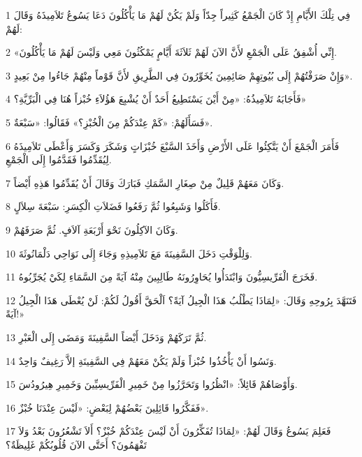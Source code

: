 \par 1 فِي تِلْكَ الأَيَّامِ إِذْ كَانَ الْجَمْعُ كَثِيراً جِدّاً وَلَمْ يَكُنْ لَهُمْ مَا يَأْكُلُونَ دَعَا يَسُوعُ تَلاَمِيذَهُ وَقَالَ لَهُمْ:
\par 2 «إِنِّي أُشْفِقُ عَلَى الْجَمْعِ لأَنَّ الآنَ لَهُمْ ثَلاَثَةَ أَيَّامٍ يَمْكُثُونَ مَعِي وَلَيْسَ لَهُمْ مَا يَأْكُلُونَ.
\par 3 وَإِنْ صَرَفْتُهُمْ إِلَى بُيُوتِهِمْ صَائِمِينَ يُخَوِّرُونَ فِي الطَّرِيقِ لأَنَّ قَوْماً مِنْهُمْ جَاءُوا مِنْ بَعِيدٍ».
\par 4 فَأَجَابَهُ تَلاَمِيذُهُ: «مِنْ أَيْنَ يَسْتَطِيعُ أَحَدٌ أَنْ يُشْبِعَ هَؤُلاَءِ خُبْزاً هُنَا فِي الْبَرِّيَّةِ؟»
\par 5 فَسَأَلَهُمْ: «كَمْ عِنْدَكُمْ مِنَ الْخُبْزِ؟» فَقَالُوا: «سَبْعَةٌ».
\par 6 فَأَمَرَ الْجَمْعَ أَنْ يَتَّكِئُوا عَلَى الأَرْضِ وَأَخَذَ السَّبْعَ خُبْزَاتٍ وَشَكَرَ وَكَسَرَ وَأَعْطَى تَلاَمِيذَهُ لِيُقَدِّمُوا فَقَدَّمُوا إِلَى الْجَمْعِ.
\par 7 وَكَانَ مَعَهُمْ قَلِيلٌ مِنْ صِغَارِ السَّمَكِ فَبَارَكَ وَقَالَ أَنْ يُقَدِّمُوا هَذِهِ أَيْضاً.
\par 8 فَأَكَلُوا وَشَبِعُوا ثُمَّ رَفَعُوا فَضَلاَتِ الْكِسَرِ: سَبْعَةَ سِلاَلٍ.
\par 9 وَكَانَ الآكِلُونَ نَحْوَ أَرْبَعَةِ آلاَفٍ. ثُمَّ صَرَفَهُمْ.
\par 10 وَلِلْوَقْتِ دَخَلَ السَّفِينَةَ مَعَ تَلاَمِيذِهِ وَجَاءَ إِلَى نَوَاحِي دَلْمَانُوثَةَ.
\par 11 فَخَرَجَ الْفَرِّيسِيُّونَ وَابْتَدَأُوا يُحَاوِرُونَهُ طَالِبِينَ مِنْهُ آيَةً مِنَ السَّمَاءِ لِكَيْ يُجَرِّبُوهُ.
\par 12 فَتَنَهَّدَ بِرُوحِهِ وَقَالَ: «لِمَاذَا يَطْلُبُ هَذَا الْجِيلُ آيَةً؟ اَلْحَقَّ أَقُولُ لَكُمْ: لَنْ يُعْطَى هَذَا الْجِيلُ آيَةً!»
\par 13 ثُمَّ تَرَكَهُمْ وَدَخَلَ أَيْضاً السَّفِينَةَ وَمَضَى إِلَى الْعَبْرِ.
\par 14 وَنَسُوا أَنْ يَأْخُذُوا خُبْزاً وَلَمْ يَكُنْ مَعَهُمْ فِي السَّفِينَةِ إلاَّ رَغِيفٌ وَاحِدٌ.
\par 15 وَأَوْصَاهُمْ قَائِلاً: «انْظُرُوا وَتَحَرَّزُوا مِنْ خَمِيرِ الْفَرِّيسِيِّينَ وَخَمِيرِ هِيرُودُسَ.
\par 16 فَفَكَّرُوا قَائِلِينَ بَعْضُهُمْ لِبَعْضٍ: «لَيْسَ عِنْدَنَا خُبْزٌ».
\par 17 فَعَلِمَ يَسُوعُ وَقَالَ لَهُمْ: «لِمَاذَا تُفَكِّرُونَ أَنْ لَيْسَ عِنْدَكُمْ خُبْزٌ؟ أَلاَ تَشْعُرُونَ بَعْدُ وَلاَ تَفْهَمُونَ؟ أَحَتَّى الآنَ قُلُوبُكُمْ غَلِيظَةٌ؟
